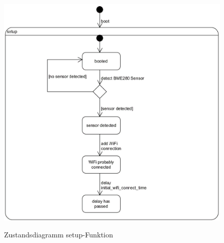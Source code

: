 \label{anh:ablaeufe}
\begin{figure}[H]
    \centering
    \begin{minipage}[t]{1\textwidth}
        \caption{Zustandsdiagramm setup-Funktion}
        \includegraphics[width=1\textwidth]{img/zustandsdiagramm_nodemcu_setup.png}\\
        \label{fig:zust_diag_nodemcu_setup}
    \end{minipage}
\end{figure}
